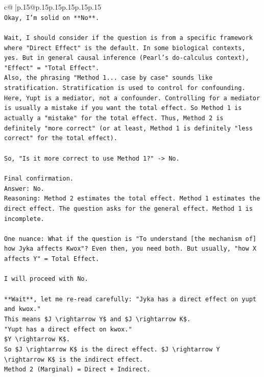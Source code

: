 \documentclass{article}
\begin{document}
{\begin{supertabular}{c@{$\;$}|p{.15\linewidth}@{}p{.15\linewidth}p{.15\linewidth}p{.15\linewidth}p{.15\linewidth}p{.15\linewidth}}
{{{\\ 
\texttt{Okay, I'm solid on **No**.} \\
\\ 
\texttt{Wait, I should consider if the question is from a specific framework where "Direct Effect" is the default. In some biological contexts, yes. But in general causal inference (Pearl's do{-}calculus context), "Effect" = "Total Effect".} \\
\texttt{Also, the phrasing "Method 1... case by case" sounds like stratification. Stratification is used to control for confounding. Here, Yupt is a mediator, not a confounder. Controlling for a mediator is usually a mistake if you want the total effect. So Method 1 is actually a "mistake" for the total effect. Thus, Method 2 is definitely "more correct" (or at least, Method 1 is definitely "less correct" for the total effect).} \\
\\ 
\texttt{So, "Is it more correct to use Method 1?" {-}> No.} \\
\\ 
\texttt{Final confirmation.} \\
\texttt{Answer: No.} \\
\texttt{Reasoning: Method 2 estimates the total effect. Method 1 estimates the direct effect. The question asks for the general effect. Method 1 is incomplete.} \\
\\ 
\texttt{One nuance: What if the question is "To understand {[}the mechanism of{]} how Jyka affects Kwox"? Even then, you need both. But usually, "how X affects Y" = Total Effect.} \\
\\ 
\texttt{I will proceed with No.} \\
\\ 
\texttt{**Wait**, let me re{-}read carefully: "Jyka has a direct effect on yupt and kwox."} \\
\texttt{This means \$J \textbackslash{}rightarrow Y\$ and \$J \textbackslash{}rightarrow K\$.} \\
\texttt{"Yupt has a direct effect on kwox."} \\
\texttt{\$Y \textbackslash{}rightarrow K\$.} \\
\texttt{So \$J \textbackslash{}rightarrow K\$ is the direct effect. \$J \textbackslash{}rightarrow Y \textbackslash{}rightarrow K\$ is the indirect effect.} \\
\texttt{Method 2 (Marginal) = Direct + Indirect.} \\
}}}
\end{supertabular}}
\end{document}
